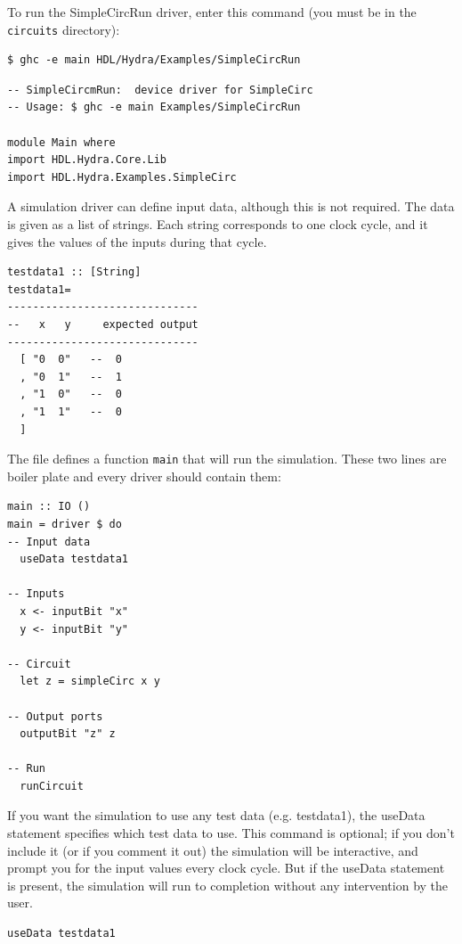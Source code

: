 \documentclass[]{svmono}
\begin{document}
To run the SimpleCircRun driver, enter this command (you must be in the
\texttt{circuits} directory):

\begin{verbatim}
$ ghc -e main HDL/Hydra/Examples/SimpleCircRun
\end{verbatim}

\begin{verbatim}
-- SimpleCircmRun:  device driver for SimpleCirc
-- Usage: $ ghc -e main Examples/SimpleCircRun

module Main where
import HDL.Hydra.Core.Lib
import HDL.Hydra.Examples.SimpleCirc
\end{verbatim}

A simulation driver can define input data, although this is not
required.  The data is given as a list of strings.  Each string
corresponds to one clock cycle, and it gives the values of the
inputs during that cycle.

\begin{verbatim}
testdata1 :: [String]
testdata1=
------------------------------
--   x   y     expected output
------------------------------
  [ "0  0"   --  0
  , "0  1"   --  1
  , "1  0"   --  0
  , "1  1"   --  0
  ]
\end{verbatim}

The file defines a function \texttt{main} that will run the simulation.
These two lines are boiler plate and every driver should contain
them:

\begin{verbatim}
main :: IO ()
main = driver $ do
-- Input data
  useData testdata1

-- Inputs
  x <- inputBit "x"
  y <- inputBit "y"

-- Circuit
  let z = simpleCirc x y

-- Output ports
  outputBit "z" z

-- Run
  runCircuit
\end{verbatim}

If you want the simulation to use any test data (e.g. testdata1),
the useData statement specifies which test data to use.  This
command is optional; if you don't include it (or if you comment it
out) the simulation will be interactive, and prompt you for the
input values every clock cycle.  But if the useData statement is
present, the simulation will run to completion without any
intervention by the user.

\begin{verbatim}
useData testdata1
\end{verbatim}
\end{document}
